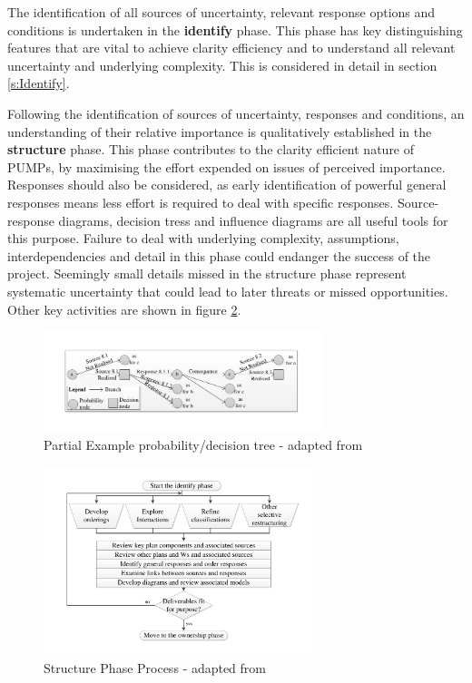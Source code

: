 The identification of all sources of uncertainty, relevant response options and conditions is undertaken in the \textbf{identify} phase.
This phase has key distinguishing features that are vital to achieve clarity efficiency and to understand all relevant uncertainty and underlying complexity.
This is considered in detail in section \ref{s:Identify}.

Following the identification of sources of uncertainty, responses and conditions, an understanding of their relative importance is qualitatively established in the \textbf{structure} phase.
This phase contributes to the clarity efficient nature of PUMPs, by maximising the effort expended on issues of perceived importance.
Responses should also be considered, as early identification of powerful general responses means less effort is required to deal with specific responses.
Source-response diagrams, decision tress and influence diagrams are all useful tools for this purpose.
Failure to deal with underlying complexity, assumptions, interdependencies and detail in this phase could endanger the success of the project.
Seemingly small details missed in the structure phase represent systematic uncertainty that could lead to later threats or missed opportunities.
Other key activities are shown in figure \ref{Figure:Structure}.

\begin{figure}[!h]
  \centering
    \includegraphics[height = 2.95cm]{./Figures/DecisionTreeChapman79.pdf} 
\caption{Partial Example probability/decision tree - adapted from \cite{SCERT}}
\label{Figure:Decisiontree}
\end{figure}

\begin{figure}[!h]
  \centering
    \includegraphics[width = 0.7\textwidth]{./Figures/Structure.pdf} 
\caption{Structure Phase Process - adapted from \cite{chapman}}
\label{Figure:Structure}
\end{figure}

